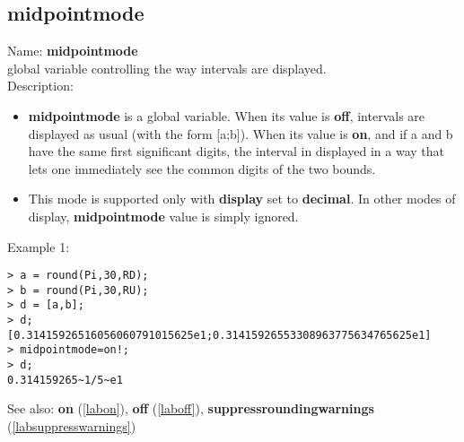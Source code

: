\subsection{midpointmode}
\label{labmidpointmode}
\noindent Name: \textbf{midpointmode}\\
global variable controlling the way intervals are displayed.\\

\noindent Description: \begin{itemize}

\item \textbf{midpointmode} is a global variable. When its value is \textbf{off}, intervals are displayed
   as usual (with the form [a;b]).
   When its value is \textbf{on}, and if a and b have the same first significant digits,
   the interval in displayed in a way that lets one immediately see the common
   digits of the two bounds.

\item This mode is supported only with \textbf{display} set to \textbf{decimal}. In other modes of 
   display, \textbf{midpointmode} value is simply ignored.
\end{itemize}
\noindent Example 1: 
\begin{center}\begin{minipage}{15cm}\begin{Verbatim}[frame=single]
> a = round(Pi,30,RD);
> b = round(Pi,30,RU);
> d = [a,b];
> d;
[0.31415926516056060791015625e1;0.31415926553308963775634765625e1]
> midpointmode=on!;
> d;
0.314159265~1/5~e1
\end{Verbatim}
\end{minipage}\end{center}
See also: \textbf{on} (\ref{labon}), \textbf{off} (\ref{laboff}), \textbf{suppressroundingwarnings} (\ref{labsuppresswarnings})
